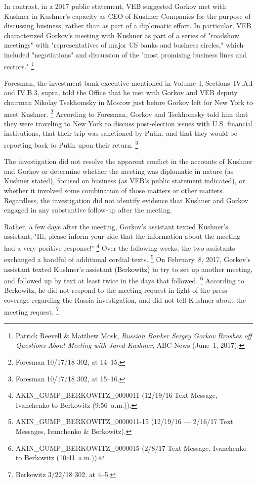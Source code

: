 In contrast, in a 2017 public statement, VEB suggested Gorkov met with Kushner in Kushner's capacity as CEO of Kushner Companies for the purpose of discussing business, rather than as part of a diplomatic effort.
In particular, VEB characterized Gorkov's meeting with Kushner as part of a series of "roadshow meetings" with "representatives of major US banks and business circles," which included "negotiations" and discussion of the "most promising business lines and sectors."%
\footnote{Patrick Reevell \& Matthew Mosk, \textit{Russian Banker Sergey Gorkov Brushes off Questions About Meeting with Jared Kushner}, ABC News (June~1, 2017).}

Foresman, the investment bank executive mentioned in Volume~l, Sections~IV.A.I and IV.B.3, supra, told the Office that he met with Gorkov and VEB deputy chairman Nikolay Tsekhomsky in Moscow just before Gorkov left for New York to meet Kushner.%
\footnote{Foresman 10/17/18 302, at 14--15.}
According to Foresman, Gorkov and Tsekhomsky told him that they were traveling to New York to discuss post-election issues with U.S. financial institutions, that their trip was sanctioned by Putin, and that they would be reporting back to Putin upon their return.%
\footnote{Foresman 10/17/18 302, at 15--16.}

The investigation did not resolve the apparent conflict in the accounts of Kushner and Gorkov or determine whether the meeting was diplomatic in nature (as Kushner stated), focused on business (as VEB's public statement indicated), or whether it involved some combination of those matters or other matters.
Regardless, the investigation did not identify evidence that Kushner and Gorkov engaged in any substantive follow-up after the meeting.

Rather, a few days after the meeting, Gorkov's assistant texted Kushner's assistant, "Hi, please inform your side that the information about the meeting had a very positive response!"%
\footnote{AKIN\_GUMP\_BERKOWITZ\_0000011 (12/19/16 Text Message, Ivanchenko to Berkowitz (9:56~a.m.)).}
Over the following weeks, the two assistants exchanged a handful of additional cordial texts.%
\footnote{AKIN\_GUMP\_BERKOWITZ\_0000011-15 (12/19/16 — 2/16/17 Text Messages, Ivanchenko \& Berkowitz).}
On February~8, 2017, Gorkov's assistant texted Kushner's assistant (Berkowitz) to try to set up another meeting, and followed up by text at least twice in the days that followed.%
\footnote{AKIN\_GUMP\_BERKOWITZ\_0000015 (2/8/17 Text Message, Ivanchenko to Berkowitz (10:41~a.m.)).}
According to Berkowitz, he did not respond to the meeting request in light of the press coverage regarding the Russia investigation, and did not tell Kushner about the meeting request.%
\footnote{Berkowitz 3/22/18 302, at 4--5.}

